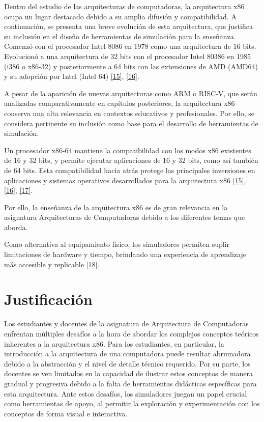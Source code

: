 \documentclass[12pt,oneside]{templates/unerthesis}
\begin{document}
Dentro del estudio de las arquitecturas de computadoras, la arquitectura x86 ocupa un lugar destacado debido a su amplia difusión y compatibilidad. A continuación, se presenta una breve evolución de esta arquitectura, que justifica su inclusión en el diseño de herramientas de simulación para la enseñanza. Comenzó con el procesador Intel 8086 en 1978 como una arquitectura de 16 bits. Evolucionó a una arquitectura de 32 bits con el procesador Intel 80386 en 1985 (i386 o x86-32) y posteriormente a 64 bits con las extensiones de AMD (AMD64) y su adopción por Intel (Intel 64) \protect\hyperlink{ref-intel_64_2025}{{[}15{]}}, \protect\hyperlink{ref-amd_developer_2024}{{[}16{]}}.

A pesar de la aparición de nuevas arquitecturas como ARM o RISC-V, que serán analizadas comparativamente en capítulos posteriores, la arquitectura x86 conserva una alta relevancia en contextos educativos y profesionales. Por ello, se considera pertinente su inclusión como base para el desarrollo de herramientas de simulación.

Un procesador x86-64 mantiene la compatibilidad con los modos x86 existentes de 16 y 32 bits, y permite ejecutar aplicaciones de 16 y 32 bits, como así también de 64 bits. Esta compatibilidad hacia atrás protege las principales inversiones en aplicaciones y sistemas operativos desarrollados para la arquitectura x86 \protect\hyperlink{ref-intel_64_2025}{{[}15{]}}, \protect\hyperlink{ref-amd_developer_2024}{{[}16{]}}, \protect\hyperlink{ref-abel_ibm_2000}{{[}17{]}}.

Por ello, la enseñanza de la arquitectura x86 es de gran relevancia en la asignatura Arquitecturas de Computadoras debido a los diferentes temas que aborda.

Como alternativa al equipamiento físico, los simuladores permiten suplir limitaciones de hardware y tiempo, brindando una experiencia de aprendizaje más accesible y replicable \protect\hyperlink{ref-skrien_cpu_2001}{{[}18{]}}.

\hypertarget{justificaciuxf3n}{%
\section{Justificación}\label{justificaciuxf3n}}

Los estudiantes y docentes de la asignatura de Arquitectura de Computadoras enfrentan múltiples desafíos a la hora de abordar los complejos conceptos teóricos inherentes a la arquitectura x86. Para los estudiantes, en particular, la introducción a la arquitectura de una computadora puede resultar abrumadora debido a la abstracción y el nivel de detalle técnico requerido. Por su parte, los docentes se ven limitados en la capacidad de ilustrar estos conceptos de manera gradual y progresiva debido a la falta de herramientas didácticas específicas para esta arquitectura. Ante estos desafíos, los simuladores juegan un papel crucial como herramientas de apoyo, al permitir la exploración y experimentación con los conceptos de forma visual e interactiva.
\end{document}
